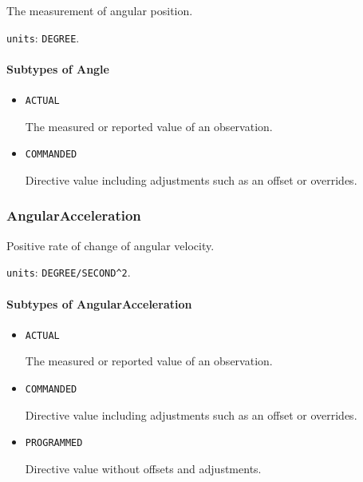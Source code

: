 The measurement of angular position.


\texttt{units}: \texttt{DEGREE}.

\paragraph{Subtypes of Angle}\mbox{}
\label{sec:Subtypes of Angle}

\begin{itemize}

\item \texttt{ACTUAL}


The measured or reported value of an \gls{observation}.

\item \texttt{COMMANDED}


Directive value including adjustments such as an offset or overrides.


\end{itemize}





\subsubsection{AngularAcceleration}
\label{sec:AngularAcceleration}



Positive rate of change of angular velocity.


\texttt{units}: \texttt{DEGREE/SECOND\^{}2}.

\paragraph{Subtypes of AngularAcceleration}\mbox{}
\label{sec:Subtypes of AngularAcceleration}

\begin{itemize}

\item \texttt{ACTUAL}


The measured or reported value of an \gls{observation}.

\item \texttt{COMMANDED}


Directive value including adjustments such as an offset or overrides.

\item \texttt{PROGRAMMED}


Directive value without offsets and adjustments.


\end{itemize}






